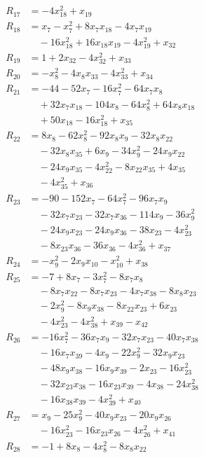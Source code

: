 \begin{align*}
R_{17}&=-4x_{18}^{2}+x_{19}\\
R_{18}&=x_{7}-x_{7}^{2}+8x_{7}x_{18}-4x_{7}x_{19}\\
&\quad{}-16x_{18}^{2}+16x_{18}x_{19}-4x_{19}^{2}+x_{32}\\
R_{19}&=1+2x_{32}-4x_{32}^{2}+x_{33}\\
R_{20}&=-x_{8}^{2}-4x_{8}x_{33}-4x_{33}^{2}+x_{34}\\
R_{21}&=-44-52x_{7}-16x_{7}^{2}-64x_{7}x_{8}\\
&\quad{}+32x_{7}x_{18}-104x_{8}-64x_{8}^{2}+64x_{8}x_{18}\\
&\quad{}+50x_{18}-16x_{18}^{2}+x_{35}\\
R_{22}&=8x_{8}-62x_{8}^{2}-92x_{8}x_{9}-32x_{8}x_{22}\\
&\quad{}-32x_{8}x_{35}+6x_{9}-34x_{9}^{2}-24x_{9}x_{22}\\
&\quad{}-24x_{9}x_{35}-4x_{22}^{2}-8x_{22}x_{35}+4x_{35}\\
&\quad{}-4x_{35}^{2}+x_{36}\\
R_{23}&=-90-152x_{7}-64x_{7}^{2}-96x_{7}x_{9}\\
&\quad{}-32x_{7}x_{23}-32x_{7}x_{36}-114x_{9}-36x_{9}^{2}\\
&\quad{}-24x_{9}x_{23}-24x_{9}x_{36}-38x_{23}-4x_{23}^{2}\\
&\quad{}-8x_{23}x_{36}-36x_{36}-4x_{36}^{2}+x_{37}\\
R_{24}&=-x_{9}^{2}-2x_{9}x_{10}-x_{10}^{2}+x_{38}\\
R_{25}&=-7+8x_{7}-3x_{7}^{2}-8x_{7}x_{8}\\
&\quad{}-8x_{7}x_{22}-8x_{7}x_{23}-4x_{7}x_{38}-8x_{8}x_{23}\\
&\quad{}-2x_{9}^{2}-8x_{9}x_{38}-8x_{22}x_{23}+6x_{23}\\
&\quad{}-4x_{23}^{2}-4x_{38}^{2}+x_{39}-x_{42}\\
R_{26}&=-16x_{7}^{2}-36x_{7}x_{9}-32x_{7}x_{23}-40x_{7}x_{38}\\
&\quad{}-16x_{7}x_{39}-4x_{9}-22x_{9}^{2}-32x_{9}x_{23}\\
&\quad{}-48x_{9}x_{38}-16x_{9}x_{39}-2x_{23}-16x_{23}^{2}\\
&\quad{}-32x_{23}x_{38}-16x_{23}x_{39}-4x_{38}-24x_{38}^{2}\\
&\quad{}-16x_{38}x_{39}-4x_{39}^{2}+x_{40}\\
R_{27}&=x_{9}-25x_{9}^{2}-40x_{9}x_{23}-20x_{9}x_{26}\\
&\quad{}-16x_{23}^{2}-16x_{23}x_{26}-4x_{26}^{2}+x_{41}\\
R_{28}&=-1+8x_{8}-4x_{8}^{2}-8x_{8}x_{22}\\

\end{align*}
